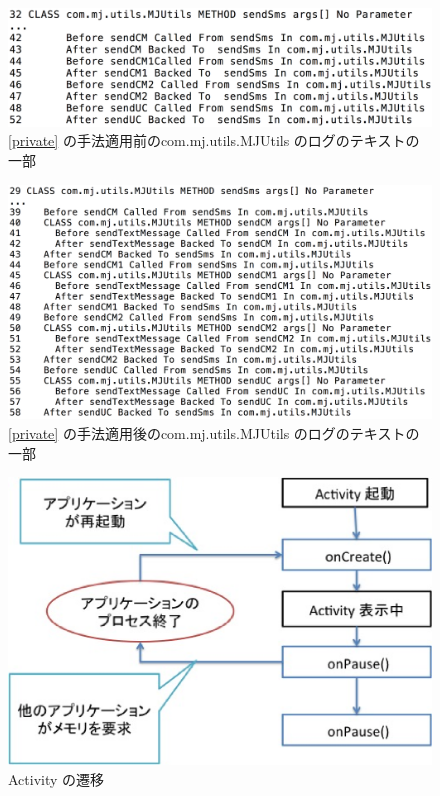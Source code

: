 \begin{figure}[t]
\begin{center}
\graphicspath{{./epsfiles/}}
\includegraphics[scale=0.15]{mjutilslog1.eps}
\end{center}
\caption{\ref{private} の手法適用前のcom.mj.utils.MJUtils のログのテキストの一部}
\label{mjutilslog1}
\end{figure}

\begin{figure}[t]
\begin{center}
\graphicspath{{./epsfiles/}}
\includegraphics[scale=0.15]{mjutilslog2.eps}
\end{center}
\caption{\ref{private} の手法適用後のcom.mj.utils.MJUtils のログのテキストの一部}
\label{mjutilslog2}
\end{figure}



\begin{figure}[t]
\begin{center}
\graphicspath{{./epsfiles/}}
\includegraphics[scale=0.4]{activity4.eps}
\end{center}
\caption{Activity の遷移}
\label{activity}
\end{figure}


